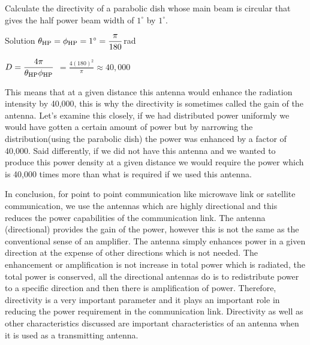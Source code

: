\begin{exmp}
Calculate the directivity of a parabolic dish whose main beam is circular that gives the half power beam width of $1^\circ$ by $1^\circ$.
\begin{center}
Solution
$\theta_{\textnormal{HP}} =\phi_{\textnormal{HP}} =1^{\circ
}=\dfrac{\pi}{180}$rad


$D=\dfrac{4\pi}{\theta_{\textnormal{HP}}\phi_{\textnormal{HP}}}$
$= \frac{4(180)^2}{\pi} \approx 40,000$
\end{center}
\end{exmp}

This means that at a given distance this antenna would enhance the radiation intensity by 40,000, this is why the directivity is sometimes called the gain of the antenna. Let's examine this closely, if we had distributed power uniformly we would have gotten a certain amount of power but by narrowing the distribution(using the parabolic dish) the power was enhanced by a factor of 40,000. Said differently, if we did not have this antenna and we wanted to produce this power density at a given distance we would require the power which is 40,000 times more than what is required if we used this antenna.

In conclusion, for point to point communication like microwave link or satellite communication, we use the antennas which are highly directional and this reduces the power capabilities of the communication link. The antenna (directional) provides the gain of the power, however this is not the same as the conventional sense of an amplifier. The antenna simply enhances power in a given direction at the expense of other directions which is not needed. The enhancement or amplification is not increase in total power which is radiated, the total power is conserved, all the directional antennas do is to redistribute power to a specific direction and then there is amplification of power. Therefore, directivity is a very important parameter and it plays an important role in reducing the power requirement in the communication link. Directivity as well as other characteristics discussed are important characteristics of an antenna when it is used as a transmitting antenna.